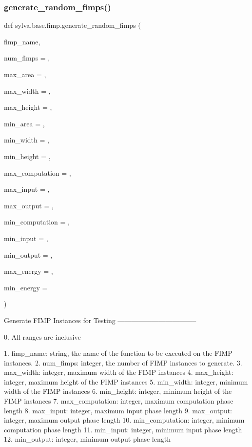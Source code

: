 \subsubsection{\texorpdfstring{generate\+\_\+random\+\_\+fimps()}{generate\_random\_fimps()}}
{\footnotesize\ttfamily def sylva.\+base.\+fimp.\+generate\+\_\+random\+\_\+fimps (\begin{DoxyParamCaption}\item[{}]{fimp\+\_\+name,  }\item[{}]{num\+\_\+fimps = {},  }\item[{}]{max\+\_\+area = {},  }\item[{}]{max\+\_\+width = {},  }\item[{}]{max\+\_\+height = {},  }\item[{}]{min\+\_\+area = {},  }\item[{}]{min\+\_\+width = {},  }\item[{}]{min\+\_\+height = {},  }\item[{}]{max\+\_\+computation = {},  }\item[{}]{max\+\_\+input = {},  }\item[{}]{max\+\_\+output = {},  }\item[{}]{min\+\_\+computation = {},  }\item[{}]{min\+\_\+input = {},  }\item[{}]{min\+\_\+output = {},  }\item[{}]{max\+\_\+energy = {},  }\item[{}]{min\+\_\+energy = {} }\end{DoxyParamCaption})}

\begin{DoxyVerb}  Generate FIMP Instances for Testing
  -----------------------------------

  0. All ranges are inclusive

  1. fimp_name: string, the name of the function to be executed on the FIMP instances.
  2. num_fimps: integer, the number of FIMP instances to generate.
  3. max_width: integer, maximum width of the FIMP instances
  4. max_height: integer, maximum height of the FIMP instances
  5. min_width: integer, minimum width of the FIMP instances
  6. min_height: integer, minimum height of the FIMP instances
  7. max_computation: integer, maximum computation phase length
  8. max_input: integer, maximum input phase length
  9. max_output: integer, maximum output phase length
  10. min_computation: integer, minimum computation phase length
  11. min_input: integer, minimum input phase length
  12. min_output: integer, minimum output phase length
\end{DoxyVerb}
 

